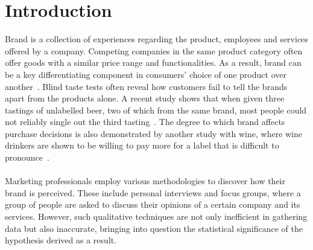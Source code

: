\documentclass[a4paper,12pt,twoside,openright]{report}
\newcommand{\nl}{\\ \\}
\begin{document}
\pagestyle{empty}
\singlespacing

\onehalfspacing

\singlespacing


\setcounter{page}{0}
\pagestyle{plain}

\singlespacing
\tableofcontents
\listoffigures
\listoftables

{}


\chapter{Introduction}
\setcounter{page}{1} 

Brand is a collection of experiences regarding the product, employees and services offered by a company. Competing companies in the same product category often offer goods with a similar price range and functionalities. As a result, brand can be a key differentiating component in consumers' choice of one product over another~\cite{makens65}. Blind taste tests often reveal how customers fail to tell the brands apart from the products alone. A recent study shows that when given three tastings of unlabelled beer, two of which from the same brand, most people could not reliably single out the third tasting~\cite{almenberg14}. The degree to which brand affects purchase decisions is also demonstrated by another study with wine, where wine drinkers are shown to be willing to pay more for a label that is difficult to pronounce~\cite{mantonakis13}.
\nl
Marketing professionals employ various methodologies to discover how their brand is perceived. These include personal interviews and focus groups, where a group of people are asked to discuss their opinions of a certain company and its services. However, such qualitative techniques are not only inefficient in gathering data but also inaccurate, bringing into question the statistical significance of the hypothesis derived as a result. 
\nl
\end{document}
